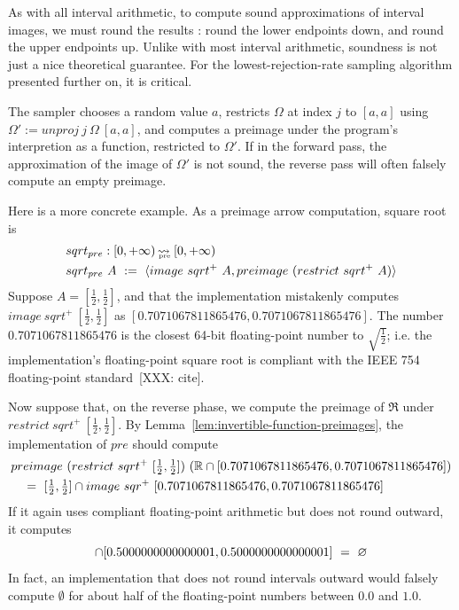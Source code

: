 As with all interval arithmetic, to compute sound approximations of interval images, we must round the results : round the lower endpoints down, and round the upper endpoints up.
Unlike with most interval arithmetic, soundness is not just a nice theoretical guarantee.
For the lowest-rejection-rate sampling algorithm presented further on, it is critical.

The sampler chooses a random value $a$, restricts $\Omega$ at index $j$ to $[a,a]$ using $\Omega' := unproj~j~\Omega~[a,a]$, and computes a preimage under the program's interpretion as a function, restricted to $\Omega'$.
If in the forward pass, the approximation of the image of $\Omega'$ is not sound, the reverse pass will often falsely compute an empty preimage.

Here is a more concrete example.
As a preimage arrow computation, square root is
\begin{equation}
\begin{aligned}
	&sqrt_{pre} : [0,+\infty) \operatorname{\rightsquigarrow_{\mspace{-20mu}_\mathrm{pre}}}\,[0,+\infty) \\
	&sqrt_{pre}~A\ :=\ \langle{image~sqrt^+~A, preimage~(restrict~sqrt^+~A)}\rangle
\end{aligned}
\end{equation}
Suppose $A = [\frac{1}{2},\frac{1}{2}]$, and that the implementation mistakenly computes $image~sqrt^+~[\frac{1}{2},\frac{1}{2}]$ as $[0.7071067811865476,0.7071067811865476]$.
The number $0.7071067811865476$ is the closest 64-bit floating-point number to $\sqrt{\frac{1}{2}}$; i.e. the implementation's floating-point square root is compliant with the IEEE 754 floating-point standard~[XXX: cite].

Now suppose that, on the reverse phase, we compute the preimage of $\Re$ under $restrict~sqrt^+~[\frac{1}{2},\frac{1}{2}]$.
By Lemma~\ref{lem:invertible-function-preimages}, the implementation of $pre$ should compute
\begin{equation}
\begin{aligned}
	&preimage~(restrict~sqrt^+~[\tfrac{1}{2},\tfrac{1}{2}])~(\mathbb{R} \cap [0.7071067811865476,0.7071067811865476])
\\
	&\ \ \ =\ [\tfrac{1}{2},\tfrac{1}{2}] \cap image~sqr^+~[0.7071067811865476,0.7071067811865476]
\end{aligned}
\end{equation}
If it again uses compliant floating-point arithmetic but does not round outward, it computes
\begin{equation}
	[\tfrac{1}{2},\tfrac{1}{2}] \i [0.5000000000000001,0.5000000000000001]\ =\ \emptyset
\end{equation}
In fact, an implementation that does not round intervals outward would falsely compute $\emptyset$ for about half of the floating-point numbers between $0.0$ and $1.0$.

